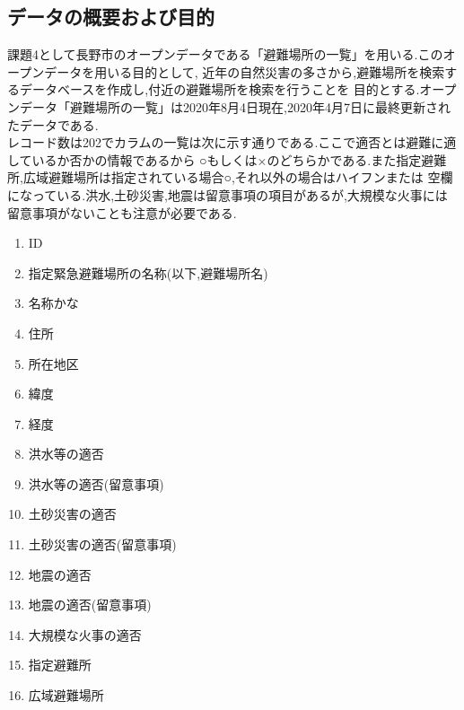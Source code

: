 \documentclass[a4j]{jarticle}
\begin{document}
    \subsection{データの概要および目的}
    課題4として長野市のオープンデータである「避難場所の一覧」を用いる\cite{open}.このオープンデータを用いる目的として,
    近年の自然災害の多さから,避難場所を検索するデータベースを作成し,付近の避難場所を検索を行うことを
    目的とする.オープンデータ「避難場所の一覧」は2020年8月4日現在,2020年4月7日に最終更新されたデータである.\\
    レコード数は202でカラムの一覧は次に示す通りである.ここで適否とは避難に適しているか否かの情報であるから
    ○もしくは×のどちらかである.また指定避難所,広域避難場所は指定されている場合○,それ以外の場合はハイフンまたは
    空欄になっている.洪水,土砂災害,地震は留意事項の項目があるが,大規模な火事には留意事項がないことも注意が必要である.
    \begin{enumerate}
      \item ID
      \item 指定緊急避難場所の名称(以下,避難場所名)
      \item 名称かな
      \item 住所
      \item 所在地区
      \item 緯度
      \item 経度
      \item 洪水等の適否
      \item 洪水等の適否(留意事項)
      \item 土砂災害の適否
      \item 土砂災害の適否(留意事項)
      \item 地震の適否
      \item 地震の適否(留意事項)
      \item 大規模な火事の適否
      \item 指定避難所
      \item 広域避難場所
    \end{enumerate}
\end{document}
